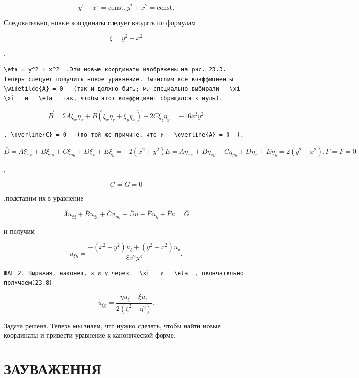 \documentclass[
  ukrainian,
]{article}
\begin{document}
\[
y^2 - x^2 = \text{const},
y^2 + x^2 = \text{const}.
\]

Следовательно, новые координаты следует вводить по формулам

\[
\xi = y^2 - x^2
\]

,

\begin{verbatim}
\eta = y^2 + x^2  .Эти новые координаты изображены на рис. 23.3. Теперь следует получить новое уравнение. Вычислим все коэффициенты  \widetilde{A} = 0   (так и должно быть; мы специально выбирали   \xi \xi   и   \eta   так, чтобы этот коэффициент обращался в нуль).
\end{verbatim}

\[
\vec{B} = 2A\xi_x\eta_x + B(\xi_x\eta_y + \xi_y\eta_x) + 2C\xi_y\eta_y = -16x^2y^2
\]

\begin{verbatim}
, \overline{C} = 0   (по той же причине, что и   \overline{A} = 0  ),
\end{verbatim}

\[
\bar{D} = A\xi_{xx} + B\xi_{xy} + C\xi_{yy} + D\xi_x + E\xi_y = -2(x^2 + y^2)
\widetilde{E} = A\eta_{xx} + B\eta_{xy} + C\eta_{yy} + D\eta_x + E\eta_y = 2(y^2 - x^2),
\tilde{F} = F = 0
\]

,

\[
\overline{G} = G = 0
\]

,подставим их в уравнение

\[
\overline{A}u_{\xi\xi} + \overline{B}u_{\xi\eta} + \overline{C}u_{\eta\eta} + \overline{D}u + \overline{E}u_{\eta} + \overline{F}u = \overline{G}
\]

и получим

\[
u_{\xi\eta} = \frac{-(x^2 + y^2) u_{\xi} + (y^2 - x^2) u_{\eta}}{8x^2y^3}.
\]

\begin{verbatim}
ШАГ 2. Выражая, наконец, x и y через   \xi   и   \eta  , окончательно получаем(23.8)
\end{verbatim}

\[
u_{\xi\eta} = \frac{\eta u_{\xi} - \xi u_{\eta}}{2(\xi^2 - \eta^2)}.
\]

Задача решена. Теперь мы знаем, что нужно сделать, чтобы найти новые
координаты и привести уравнение к канонической форме.

\section{ЗАУВАЖЕННЯ}\label{ux437ux430ux443ux432ux430ux436ux435ux43dux43dux44f}
\end{document}

